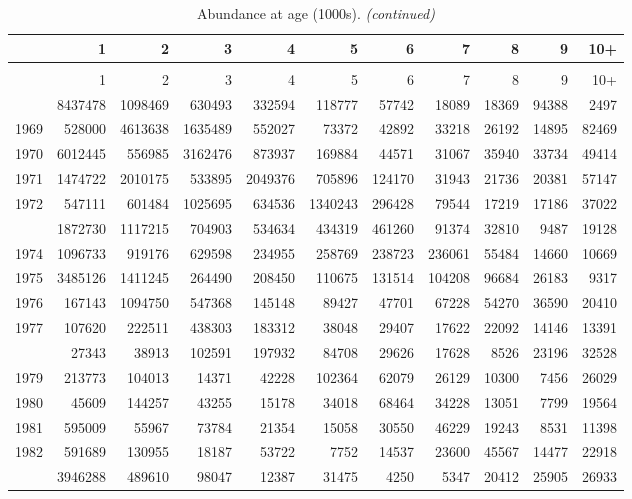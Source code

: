 \documentclass[
]{article}
\begin{document}
\begin{longtable}[t]{lrrrrrrrrrr}
\caption{\label{tab:NAA-table}Abundance at age (1000s).}\\
\toprule
  & 1 & 2 & 3 & 4 & 5 & 6 & 7 & 8 & 9 & 10+\\
\midrule
\endfirsthead
\caption[]{Abundance at age (1000s). \textit{(continued)}}\\
\toprule
  & 1 & 2 & 3 & 4 & 5 & 6 & 7 & 8 & 9 & 10+\\
\midrule
\endhead

\endfoot
\bottomrule
\endlastfoot
1968 & 8437478 & 1098469 & 630493 & 332594 & 118777 & 57742 & 18089 & 18369 & 94388 & 2497\\
1969 & 528000 & 4613638 & 1635489 & 552027 & 73372 & 42892 & 33218 & 26192 & 14895 & 82469\\
1970 & 6012445 & 556985 & 3162476 & 873937 & 169884 & 44571 & 31067 & 35940 & 33734 & 49414\\
1971 & 1474722 & 2010175 & 533895 & 2049376 & 705896 & 124170 & 31943 & 21736 & 20381 & 57147\\
1972 & 547111 & 601484 & 1025695 & 634536 & 1340243 & 296428 & 79544 & 17219 & 17186 & 37022\\
\addlinespace
1973 & 1872730 & 1117215 & 704903 & 534634 & 434319 & 461260 & 91374 & 32810 & 9487 & 19128\\
1974 & 1096733 & 919176 & 629598 & 234955 & 258769 & 238723 & 236061 & 55484 & 14660 & 10669\\
1975 & 3485126 & 1411245 & 264490 & 208450 & 110675 & 131514 & 104208 & 96684 & 26183 & 9317\\
1976 & 167143 & 1094750 & 547368 & 145148 & 89427 & 47701 & 67228 & 54270 & 36590 & 20410\\
1977 & 107620 & 222511 & 438303 & 183312 & 38048 & 29407 & 17622 & 22092 & 14146 & 13391\\
\addlinespace
1978 & 27343 & 38913 & 102591 & 197932 & 84708 & 29626 & 17628 & 8526 & 23196 & 32528\\
1979 & 213773 & 104013 & 14371 & 42228 & 102364 & 62079 & 26129 & 10300 & 7456 & 26029\\
1980 & 45609 & 144257 & 43255 & 15178 & 34018 & 68464 & 34228 & 13051 & 7799 & 19564\\
1981 & 595009 & 55967 & 73784 & 21354 & 15058 & 30550 & 46229 & 19243 & 8531 & 11398\\
1982 & 591689 & 130955 & 18187 & 53722 & 7752 & 14537 & 23600 & 45567 & 14477 & 22918\\
\addlinespace
1983 & 3946288 & 489610 & 98047 & 12387 & 31475 & 4250 & 5347 & 20412 & 25905 & 26933\\

\end{longtable}
\end{document}
